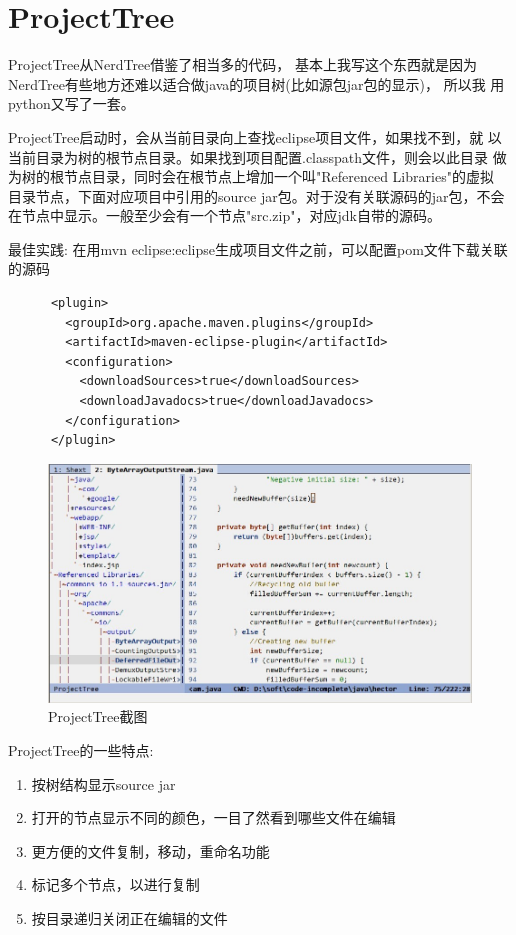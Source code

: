 \documentclass[oneside,openany]{book}
\begin{document}
\section{ProjectTree}

  ProjectTree从NerdTree借鉴了相当多的代码， 基本上我写这个东西就是因为
NerdTree有些地方还难以适合做java的项目树(比如源包jar包的显示)， 所以我
用python又写了一套。

  ProjectTree启动时，会从当前目录向上查找eclipse项目文件，如果找不到，就
以当前目录为树的根节点目录。如果找到项目配置.classpath文件，则会以此目录
做为树的根节点目录，同时会在根节点上增加一个叫"Referenced Libraries"的虚拟
目录节点，下面对应项目中引用的source jar包。对于没有关联源码的jar包，不会
在节点中显示。一般至少会有一个节点"src.zip"，对应jdk自带的源码。
  
  \begin{mdframed}[style=BestPracticeFrame]
      最佳实践: 在用mvn eclipse:eclipse生成项目文件之前，可以配置pom文件下载关联的源码
      \begin{verbatim}
      <plugin>
        <groupId>org.apache.maven.plugins</groupId>
        <artifactId>maven-eclipse-plugin</artifactId>
        <configuration>
          <downloadSources>true</downloadSources>
          <downloadJavadocs>true</downloadJavadocs>
        </configuration>
      </plugin>
      \end{verbatim}
    \end{mdframed}

  \begin{figure}[htbp]%
  \centering
  \includegraphics[scale=0.5]{tree.jpg}
  \caption{ProjectTree截图}
  \end{figure}

  ProjectTree的一些特点:
  \begin{enumerate}
    \item 按树结构显示source jar 
    \item 打开的节点显示不同的颜色，一目了然看到哪些文件在编辑
    \item 更方便的文件复制，移动，重命名功能
    \item 标记多个节点，以进行复制
    \item 按目录递归关闭正在编辑的文件
  \end{enumerate}
\end{document}
